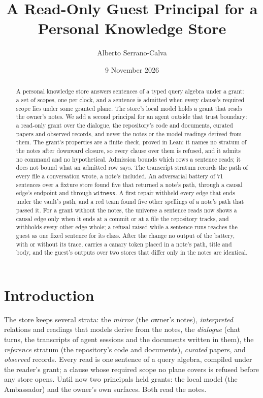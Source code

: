 \documentclass[11pt]{article}
\title{A Read-Only Guest Principal for a Personal Knowledge Store}
\author{Alberto Serrano-Calva}
\date{9 November 2026}
\theoremstyle{plain}
\theoremstyle{definition}
\theoremstyle{remark}
\begin{document}
\maketitle

\begin{abstract}
A personal knowledge store answers sentences of a typed query algebra under a grant: a set of
scopes, one per clock, and a sentence is admitted when every clause's required scope lies under
some granted plane. The store's local model holds a grant that reads the owner's notes. We add a
second principal for an agent outside that trust boundary: a read-only grant over the dialogue,
the repository's code and documents, curated papers and observed records, and never the notes or
the model readings derived from them. The grant's properties are a finite check, proved in Lean:
it names no stratum of the notes after downward closure, so every clause over them is refused, and
it admits no command and no hypothetical. Admission bounds which rows a sentence reads; it does not
bound what an admitted row says. The transcript stratum records the path of every file a
conversation wrote, a note's included. An adversarial battery of 71 sentences over a fixture store
found five that returned a note's path, through a causal edge's endpoint and through
\texttt{witness}. A first repair withheld every edge that ends under the vault's path, and a red
team found five other spellings of a note's path that passed it. For a grant without the notes,
the universe a sentence reads now shows a causal edge only when it ends at a commit or at a file
the repository tracks, and withholds every other edge whole; a refusal raised while a sentence
runs reaches the guest as one fixed sentence for its class. After the change no output of the
battery, with or without its trace, carries a canary token placed in a note's path, title and
body, and the guest's outputs over two stores that differ only in the notes are identical.
\end{abstract}

\section{Introduction}

The store \citep{palace2026} keeps several strata: the \emph{mirror} (the owner's notes),
\emph{interpreted} relations and readings that models derive from the notes, the \emph{dialogue}
(chat turns, the transcripts of agent sessions and the documents written in them), the
\emph{reference} stratum (the repository's code and documents), \emph{curated} papers, and
\emph{observed} records. Every read is one sentence of a query algebra, compiled under the
reader's grant; a clause whose required scope no plane covers is refused before any store
opens. Until now two principals held grants: the local model (the Ambassador) and the owner's own
surfaces. Both read the notes.
\end{document}
